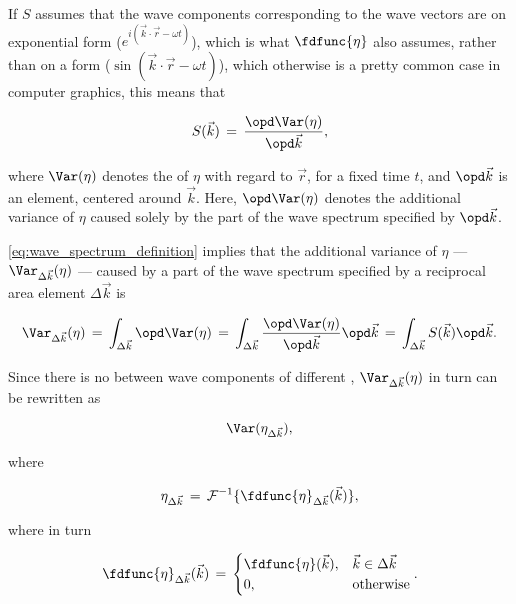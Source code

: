 {If $S$ assumes that the wave components corresponding to the wave vectors are on exponential form ($e^{i(\vec{k}\cdot\vec{r}-\omega t)}$), which is what $\fdfunc{\eta}$ also assumes, rather than on a \sinusoidal form ($\sin(\vec{k}\cdot\vec{r}-\omega t)$), which otherwise is a pretty common case in computer graphics, this means that

\begin{equation} \label{eq:wave_spectrum_definition}
S(\vec{k}) \,=\, \frac{\opd \Var(\eta)}{\opd\vec{k}},
\end{equation}

where $\Var(\eta)$ denotes the \variance of $\eta$ with regard to $\vec{r}$, for a fixed time $t$, and $\opd\vec{k}$ is an \infinitesimal {} element, centered around $\vec{k}$. Here, $\opd\Var(\eta)$ denotes the additional variance of $\eta$ caused solely by the part of the wave spectrum specified by $\opd\vec{k}$.

\eqref{eq:wave_spectrum_definition} implies that the additional variance of $\eta$ --- $\Var_{\Delta\vec{k}}(\eta)$ --- caused by a part of the wave spectrum specified by a reciprocal area element $\Delta\vec{k}$ is

\begin{equation} \label{eq:variance_k_eta}
\Var_{\Delta\vec{k}}(\eta) \,=\, \int_{\Delta\vec{k}}\opd \Var(\eta) \,=\, \int_{\Delta\vec{k}}\frac{\opd \Var(\eta)}{\opd\vec{k}}\opd\vec{k} \,=\, \int_{\Delta\vec{k}}S(\vec{k})\opd\vec{k}.
\end{equation}

Since there is no \correlation between wave components of different \wavelengths, $\Var_{\Delta\vec{k}}(\eta)$ in turn can be rewritten as

\begin{equation} \label{eq:variance_k_eta_to_variance_eta_k}
\Var(\eta_{\Delta\vec{k}}),
\end{equation}

where

\begin{equation} \label{eq:eta_k_of_fd_eta_k}
\eta_{\Delta\vec{k}} \,=\, \mathcal{F}^{-1}\{\fdfunc{\eta}_{\Delta\vec{k}}(\vec{k})\},
\end{equation}

where in turn

\begin{equation}
\fdfunc{\eta}_{\Delta\vec{k}}(\vec{k}) \,=\, \begin{cases}
\fdfunc{\eta}(\vec{k}), & \vec{k} \in \Delta\vec{k} \\
0, & \text{otherwise}
\end{cases}.
\end{equation}

}
